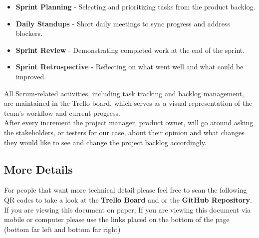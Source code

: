 \documentclass[a4paper, 12pt]{article}
\begin{document}
      \begin{itemize}
        \item \textbf{Sprint Planning} - Selecting and prioritizing tasks from the product backlog.
        \item \textbf{Daily Standups} - Short daily meetings to sync progress and address blockers.
        \item \textbf{Sprint Review} - Demonstrating completed work at the end of the sprint.
        \item \textbf{Sprint Retrospective} - Reflecting on what went well and what could be improved.
      \end{itemize}

      All Scrum-related activities, including task tracking and backlog management, are maintained in the Trello board, which serves as a visual representation of the team's workflow and current progress. \\

      After every increment the project manager, product owner, will go around asking the stakeholders, or testers for our case, about their opinion
      and what changes they would like to see and change the project backlog accordingly.
    \newpage

    \subsection{More Details}
      \noindent For people that want more technical detail please feel free to scan the following QR codes to take a look at the
      \textbf{Trello Board} and or the \textbf{GitHub Repository}.
      If you are viewing this document on paper; If you are viewing this document via mobile or computer 
      please use the links placed on the bottom of the page (bottom far left and bottom far right)
\end{document}
